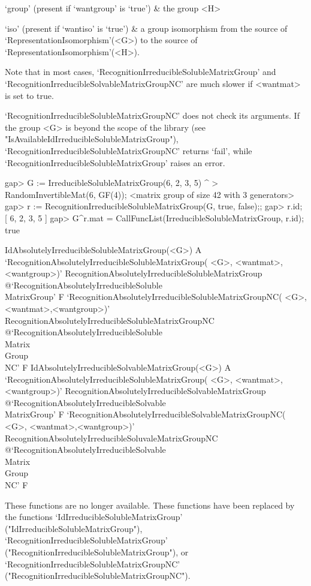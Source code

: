 `group' (present if `wantgroup' is `true') & the group <H> 

`iso' (present if `wantiso' is `true') & a group isomorphism from the source of
    `RepresentationIsomorphism'(<G>) to the source of `RepresentationIsomorphism'(<H>).
    
\enditems
Note that in most cases, `Recog\-nition\-Irreducible\-Soluble\-Matrix\-Group' and 
`Recog\-nition\-Irreducible\-Sol\-vable\-Matrix\-Group\-NC' are 
much slower if <wantmat> is set to true.   

`RecognitionIrreducibleSolubleMatrixGroupNC' does not check its arguments. If
the group <G> is beyond the scope of the {\IRREDSOL} library (see "IsAvailableIdIrreducibleSolubleMatrixGroup"), `RecognitionIrreducibleSolubleMatrixGroupNC' returns `fail', while `RecognitionIrreducibleSolubleMatrixGroup' raises an error.

\beginexample
gap> G := IrreducibleSolubleMatrixGroup(6, 2, 3, 5) ^
>         RandomInvertibleMat(6, GF(4));
<matrix group of size 42 with 3 generators>
gap> r := RecognitionIrreducibleSolubleMatrixGroup(G, true, false);;
gap> r.id;
[ 6, 2, 3, 5 ]
gap> G^r.mat = CallFuncList(IrreducibleSolubleMatrixGroup, r.id);
true
\endexample


\>IdAbsolutelyIrreducibleSolubleMatrixGroup(<G>) A
\>`RecognitionAbsolutelyIrreducibleSolubleMatrixGroup(%
   <G>, <wantmat>, <wantgroup>)'%
{RecognitionAbsolutelyIrreducibleSolubleMatrixGroup}%
@{`RecognitionAbsolutelyIrreducibleSoluble\\MatrixGroup'} F
\>`RecognitionAbsolutelyIrreducibleSolubleMatrixGroupNC(%
   <G>, <wantmat>,<wantgroup>)'%
{RecognitionAbsolutelyIrreducibleSolubleMatrixGroupNC}%
@{`RecognitionAbsolutelyIrreducibleSoluble\\Matrix\\Group\\NC'} F
\>IdAbsolutelyIrreducibleSolvableMatrixGroup(<G>) A
\>`RecognitionAbsolutelyIrreducibleSolubleMatrixGroup(%
   <G>, <wantmat>, <wantgroup>)'%
{RecognitionAbsolutelyIrreducibleSolvableMatrixGroup}%
@{`RecognitionAbsolutelyIrreducibleSolvable\\MatrixGroup'} F
\>`RecognitionAbsolutelyIrreducibleSolvableMatrixGroupNC(%
   <G>, <wantmat>,<wantgroup>)'%
{RecognitionAbsolutelyIrreducibleSoluvaleMatrixGroupNC}%
@{`RecognitionAbsolutelyIrreducibleSolvable\\Matrix\\Group\\NC'} F

These functions are no longer available. These functions have been replaced by the
functions 
`IdIrreducibleSolubleMatrixGroup' ("IdIrreducibleSolubleMatrixGroup"), 
`RecognitionIrreducibleSolubleMatrixGroup' ("RecognitionIrreducibleSolubleMatrixGroup"), or
`Recognition\-Irre\-du\-ci\-bleSolubleMatrixGroupNC' ("RecognitionIrreducibleSolubleMatrixGroupNC").

